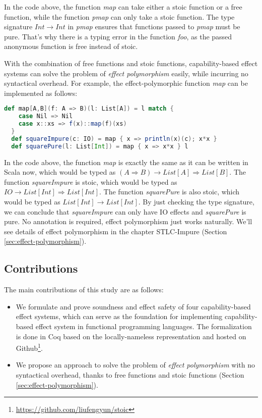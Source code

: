 In the code above, the function \emph{map} can take either a stoic
function or a free function, while the function \emph{pmap} can only
take a stoic function. The type signature $Int \to Int$ in \emph{pmap}
ensures that functions passed to \emph{pmap} must be pure. That's why
there is a typing error in the function \emph{foo}, as the passed
anonymous function is free instead of stoic.

With the combination of free functions and stoic functions,
capability-based effect systems can solve the problem of \emph{effect
  polymorphism} easily, while incurring no syntactical overhead. For
example, the effect-polymorphic function \emph{map} can be implemented
as follows:

\begin{lstlisting}[language=Scala]
  def map[A,B](f: A => B)(l: List[A]) = l match {
    case Nil => Nil
    case x::xs => f(x)::map(f)(xs)
  }
  def squareImpure(c: IO) = map { x => println(x)(c); x*x }
  def squarePure(l: List[Int]) = map { x => x*x } l
\end{lstlisting}

In the code above, the function \emph{map} is exactly the same as it
can be written in Scala now, which would be typed as
$(A \Rightarrow B) \to List[A] \Rightarrow List[B]$. The function
\emph{squareImpure} is stoic, which would be typed as
$IO \to List[Int] \Rightarrow List[Int]$. The function
\emph{squarePure} is also stoic, which would be typed as
$List[Int] \to List[Int]$. By just checking the type signature, we can
conclude that \emph{squareImpure} can only have IO effects and
\emph{squarePure} is pure. No annotation is required, effect
polymorphism just works naturally. We'll see details of effect
polymorphism in the chapter STLC-Impure (Section
\ref{sec:effect-polymorphism}).

\subsection{Contributions}

The main contributions of this study are as follows:

\begin{itemize}
\item We formulate and prove soundness and effect safety of four
  capability-based effect systems, which can serve as the foundation
  for implementing capability-based effect system in functional
  programming languages. The formalization is done in Coq based on the
  locally-nameless representation\cite{chargueraud-11-ln} and hosted
  on Github\footnote{\url{https://github.com/liufengyun/stoic}}.
\item We propose an approach to solve the problem of \emph{effect
    polymorphism} with no syntactical overhead, thanks to free
  functions and stoic functions (Section
  \ref{sec:effect-polymorphism}).
\end{itemize}

